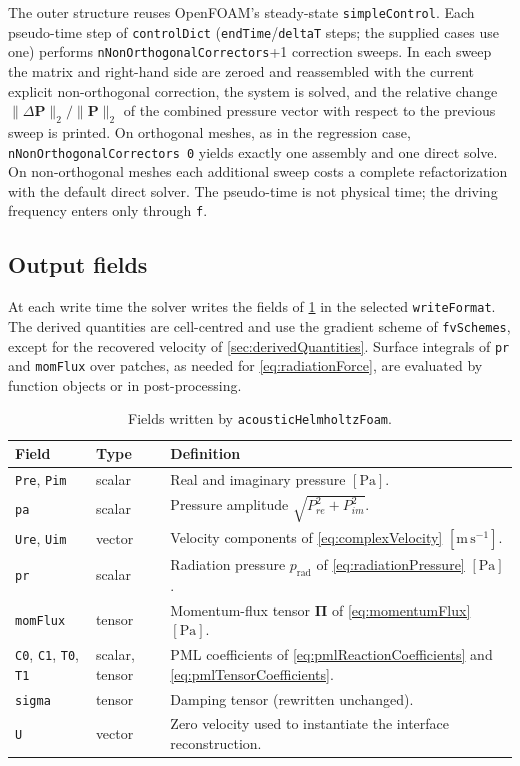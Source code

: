 \documentclass[final,12pt,nopreprintline]{elsarticle}
\newcommand{\code}[1]{\texttt{#1}}
\begin{document}
The outer structure reuses OpenFOAM's steady-state \code{simpleControl}.
Each pseudo-time step of \code{controlDict} (\code{endTime}/\code{deltaT}
steps; the supplied cases use one) performs
\code{nNonOrthogonalCorrectors}+1 correction sweeps.  In each sweep the matrix
and right-hand side are zeroed and reassembled with the current explicit
non-orthogonal correction, the system is solved, and the relative change
$\|\Delta\mathbf{P}\|_2/\|\mathbf{P}\|_2$ of the combined pressure vector with
respect to the previous sweep is printed.  On orthogonal meshes, as in the
regression case, \code{nNonOrthogonalCorrectors 0} yields exactly one
assembly and one direct solve.  On non-orthogonal meshes each additional sweep
costs a complete refactorization with the default direct solver.  The
pseudo-time is not physical time; the driving frequency enters only through
\code{f}.

\subsection{Output fields}
\label{sec:outputs}

At each write time the solver writes the fields of \cref{tab:outputs} in the
selected \code{writeFormat}.  The derived quantities are cell-centred and use
the gradient scheme of \code{fvSchemes}, except for the recovered velocity of
\cref{sec:derivedQuantities}.  Surface integrals of \code{pr} and
\code{momFlux} over patches, as needed for \cref{eq:radiationForce}, are
evaluated by function objects or in post-processing.

\begin{table}[htbp]
    \centering
    \caption{Fields written by \code{acousticHelmholtzFoam}.}
    \label{tab:outputs}
    \small
    \begin{tabular}{@{}llp{}@{}}
        \toprule
        Field & Type & Definition \\
        \midrule
        \code{Pre}, \code{Pim} & scalar & Real and imaginary pressure
        $[\mathrm{Pa}]$.\\
        \code{pa} & scalar & Pressure amplitude $\sqrt{P_{re}^2+P_{im}^2}$.\\
        \code{Ure}, \code{Uim} & vector & Velocity components of
        \cref{eq:complexVelocity} $[\mathrm{m\,s^{-1}}]$.\\
        \code{pr} & scalar & Radiation pressure $p_{\mathrm{rad}}$ of
        \cref{eq:radiationPressure} $[\mathrm{Pa}]$.\\
        \code{momFlux} & tensor & Momentum-flux tensor $\boldsymbol{\Pi}$ of
        \cref{eq:momentumFlux} $[\mathrm{Pa}]$.\\
        \code{C0}, \code{C1}, \code{T0}, \code{T1} & scalar, tensor & PML
        coefficients of \cref{eq:pmlReactionCoefficients} and
        \cref{eq:pmlTensorCoefficients}.\\
        \code{sigma} & tensor & Damping tensor (rewritten unchanged).\\
        \code{U} & vector & Zero velocity used to instantiate the interface
        reconstruction.\\
        \bottomrule
    \end{tabular}
\end{table}
\end{document}
